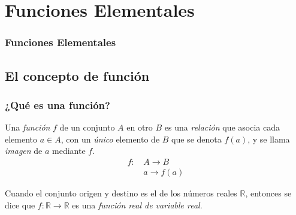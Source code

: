 
\section{Funciones Elementales}

\begin{frame}
\frametitle{Funciones Elementales}
\setlength{\parskip}{0.3em}
\tableofcontents[sectionstyle=show/hide,hideothersubsections]
\end{frame}

\subsection{El concepto de función}

\begin{frame}
\frametitle{¿Qué es una función?}
\begin{definicion}
Una \emph{función} $f$ de un conjunto $A$ en otro $B$ es una \emph{relación} que asocia cada elemento $a\in A$, con un \emph{único} elemento de $B$ que se denota $f(a)$, y se llama \emph{imagen} de $a$ mediante $f$.
\begin{align*}
f:\,&A\longrightarrow B\\
&a\longrightarrow f(a)
\end{align*}
\end{definicion}

\begin{center}
\scalebox{1}{}
\end{center}
Cuando el conjunto origen y destino es el de los números reales $\mathbb{R}$, entonces se dice que  $f:\mathbb{R}\rightarrow \mathbb{R}$ es una \emph{función real de variable real}.
\end{frame}


